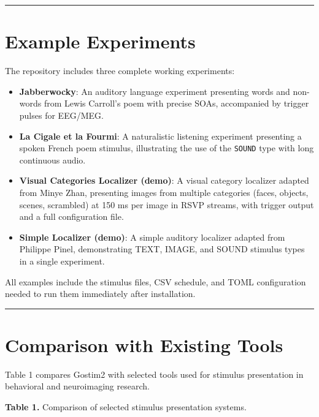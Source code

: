 \documentclass[
  11pt,
]{article}
\providecommand{\tightlist}{%
  \setlength{\itemsep}{0pt}\setlength{\parskip}{0pt}}
\begin{document}
\begin{center}\rule{0.5\linewidth}{0.5pt}\end{center}

\section{Example Experiments}\label{example-experiments}

The repository includes three complete working experiments:

\begin{itemize}
\tightlist
\item
  \textbf{Jabberwocky}: An auditory language experiment presenting words
  and non-words from Lewis Carroll's poem with precise SOAs, accompanied
  by trigger pulses for EEG/MEG.
\item
  \textbf{La Cigale et la Fourmi}: A naturalistic listening experiment
  presenting a spoken French poem stimulus, illustrating the use of the
  \texttt{SOUND} type with long continuous audio.
\item
  \textbf{Visual Categories Localizer (demo)}: A visual category
  localizer adapted from Minye Zhan, presenting images from multiple
  categories (faces, objects, scenes, scrambled) at 150 ms per image in
  RSVP streams, with trigger output and a full configuration file.
\item
  \textbf{Simple Localizer (demo)}: A simple auditory localizer adapted
  from Philippe Pinel, demonstrating TEXT, IMAGE, and SOUND stimulus
  types in a single experiment.
\end{itemize}

All examples include the stimulus files, CSV schedule, and TOML
configuration needed to run them immediately after installation.

\begin{center}\rule{0.5\linewidth}{0.5pt}\end{center}

\section{Comparison with Existing
Tools}\label{comparison-with-existing-tools}

Table 1 compares Gostim2 with selected tools used for stimulus
presentation in behavioral and neuroimaging research.

\textbf{Table 1.} Comparison of selected stimulus presentation systems.
\end{document}

